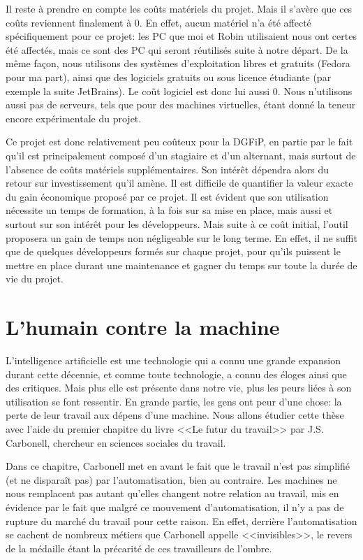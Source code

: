 \documentclass[openany, 11pt]{memoir}
\begin{document}
Il reste à prendre en compte les coûts matériels du projet. Mais il s'avère que ces coûts reviennent finalement à 0. En effet, aucun matériel n'a été affecté spécifiquement pour ce projet: les PC que moi et Robin utilisaient nous ont certes été affectés, mais ce sont des PC qui seront réutilisés suite à notre départ. De la même façon, nous utilisons des systèmes d'exploitation libres et gratuits (Fedora pour ma part), ainsi que des logiciels gratuits ou sous licence étudiante (par exemple la suite JetBrains). Le coût logiciel est donc lui aussi 0. Nous n'utilisons aussi pas de serveurs, tels que pour des machines virtuelles, étant donné la teneur encore expérimentale du projet.

Ce projet est donc relativement peu coûteux pour la DGFiP, en partie par le fait qu'il est principalement composé d'un stagiaire et d'un alternant, mais surtout de l'absence de coûts matériels supplémentaires. Son intérêt dépendra alors du retour sur investissement qu'il amène. Il est difficile de quantifier la valeur exacte du gain économique proposé par ce projet. Il est évident que son utilisation nécessite un temps de formation, à la fois sur sa mise en place, mais aussi et surtout sur son intérêt pour les développeurs. Mais suite à ce coût initial, l'outil proposera un gain de temps non négligeable sur le long terme. En effet, il ne suffit que de quelques développeurs formés sur chaque projet, pour qu'ils puissent le mettre en place durant une maintenance et gagner du temps sur toute la durée de vie du projet.

\chapter{L'humain contre la machine}

L'intelligence artificielle est une technologie qui a connu une grande expansion durant cette décennie, et comme toute technologie, a connu des éloges ainsi que des critiques. Mais plus elle est présente dans notre vie, plus les peurs liées à son utilisation se font ressentir. En grande partie, les gens ont peur d'une chose: la perte de leur travail aux dépens d'une machine. Nous allons étudier cette thèse avec l'aide du premier chapitre du livre <<Le futur du travail>> \cite{futurtravail} par J.S. Carbonell, chercheur en sciences sociales du travail.

Dans ce chapitre, Carbonell met en avant le fait que le travail n'est pas simplifié (et ne disparaît pas) par l'automatisation, bien au contraire. Les machines ne nous remplacent pas autant qu'elles changent notre relation au travail, mis en évidence par le fait que malgré ce mouvement d'automatisation, il n'y a pas de rupture du marché du travail pour cette raison. En effet, derrière l'automatisation se cachent de nombreux métiers que Carbonell appelle <<invisibles>>, le revers de la médaille étant la précarité de ces travailleurs de l'ombre.
\end{document}
